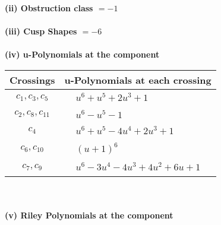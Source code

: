 \documentclass[1p]{elsarticle_modified}
\theoremstyle{definition}
\begin{document}
\flushleft \textbf{(ii) Obstruction class $= -1$}\\~\\
\flushleft \textbf{(iii) Cusp Shapes $= -6$}\\~\\
\newpage\renewcommand{\arraystretch}{1}
\flushleft \textbf{(iv) u-Polynomials at the component}\newline \\
\begin{tabular}{m{50pt}|m{274pt}}
Crossings & \hspace{64pt}u-Polynomials at each crossing \\
\hline $$\begin{aligned}c_{1},c_{3},c_{5}\end{aligned}$$&$\begin{aligned}
&u^6+u^5+2 u^3+1
\end{aligned}$\\
\hline $$\begin{aligned}c_{2},c_{8},c_{11}\end{aligned}$$&$\begin{aligned}
&u^6- u^5-1
\end{aligned}$\\
\hline $$\begin{aligned}c_{4}\end{aligned}$$&$\begin{aligned}
&u^6+u^5-4 u^4+2 u^3+1
\end{aligned}$\\
\hline $$\begin{aligned}c_{6},c_{10}\end{aligned}$$&$\begin{aligned}
&(u+1)^6
\end{aligned}$\\
\hline $$\begin{aligned}c_{7},c_{9}\end{aligned}$$&$\begin{aligned}
&u^6-3 u^4-4 u^3+4 u^2+6 u+1
\end{aligned}$\\
\hline
\end{tabular}\\~\\
\newpage\renewcommand{\arraystretch}{1}
\flushleft \textbf{(v) Riley Polynomials at the component}\newline \\
\end{document}
